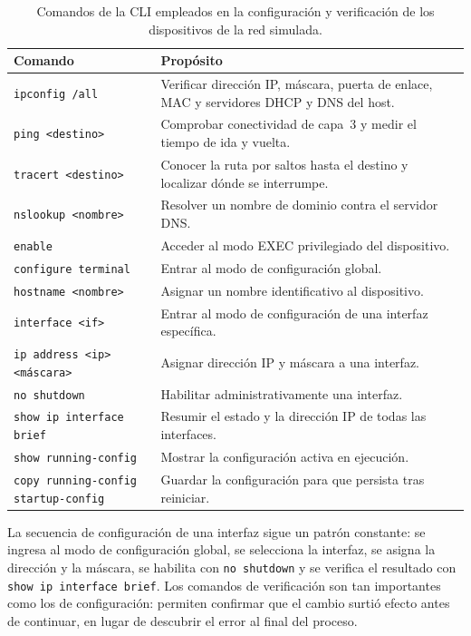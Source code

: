 \documentclass[11pt,a4paper]{article}
\begin{document}
\begin{table}[htbp]
  \centering
  \small
  \begin{tabular}{@{}p{5.4cm}p{8.6cm}@{}}
    \toprule
    \textbf{Comando} & \textbf{Propósito} \\ \midrule
    \texttt{ipconfig /all} & Verificar dirección IP, máscara, puerta de enlace, MAC y servidores DHCP y DNS del host. \\
    \texttt{ping <destino>} & Comprobar conectividad de capa~3 y medir el tiempo de ida y vuelta. \\
    \texttt{tracert <destino>} & Conocer la ruta por saltos hasta el destino y localizar dónde se interrumpe. \\
    \texttt{nslookup <nombre>} & Resolver un nombre de dominio contra el servidor DNS. \\
    \texttt{enable} & Acceder al modo EXEC privilegiado del dispositivo. \\
    \texttt{configure terminal} & Entrar al modo de configuración global. \\
    \texttt{hostname <nombre>} & Asignar un nombre identificativo al dispositivo. \\
    \texttt{interface <if>} & Entrar al modo de configuración de una interfaz específica. \\
    \texttt{ip address <ip> <máscara>} & Asignar dirección IP y máscara a una interfaz. \\
    \texttt{no shutdown} & Habilitar administrativamente una interfaz. \\
    \texttt{show ip interface brief} & Resumir el estado y la dirección IP de todas las interfaces. \\
    \texttt{show running-config} & Mostrar la configuración activa en ejecución. \\
    \texttt{copy running-config startup-config} & Guardar la configuración para que persista tras reiniciar. \\ \bottomrule
  \end{tabular}
  \caption{Comandos de la CLI empleados en la configuración y verificación de
  los dispositivos de la red simulada.}
  \label{tab:cli}
\end{table}

La secuencia de configuración de una interfaz sigue un patrón constante: se
ingresa al modo de configuración global, se selecciona la interfaz, se asigna
la dirección y la máscara, se habilita con \texttt{no shutdown} y se verifica
el resultado con \texttt{show ip interface brief}. Los comandos de
verificación son tan importantes como los de configuración: permiten confirmar
que el cambio surtió efecto antes de continuar, en lugar de descubrir el error
al final del proceso.
\end{document}
